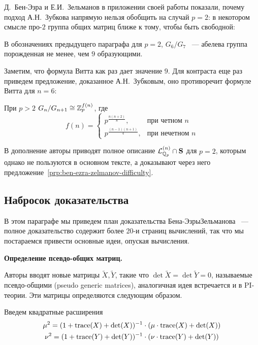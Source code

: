 Д.\ Бен-Эзра и Е.И.\ Зельманов в приложении своей работы показали, почему подход А.Н.\ Зубкова напрямую нельзя обобщить на случай $p=2$: в некотором смысле про-$2$ группа общих матриц ближе к тому, чтобы быть свободной:
\begin{proposition}
    \label{prp:ben-ezra-zelmanov-difficulty}
    В обозначениях предыдущего параграфа для $p=2$, $G_6 / G_7$ ~--- абелева группа порожденная не менее, чем $9$ образующими.
\end{proposition}
Заметим, что формула Витта как раз дает значение $9$.
Для контраста еще раз приведем предложение, доказанное А.Н.\ Зубковым, оно противоречит формуле Витта для $n=6$:
\begin{proposition}
    При $p>2$ $G_n / G_{n+1} \cong \mathbb{Z}_p^{f(n)}$, где\\
    \[
        f(n) =
        \begin{cases}
            p^{\frac{n(n+2)}{8}}, & \text{при четном $n$} \\
            p^{\frac{(n-1)(n+1)}{4}}, & \text{при нечетном $n$}
        \end{cases}
    \]
\end{proposition}

В дополнение авторы приводят полное описание $\mathcal{L}^{(n)}_{\mathbb{Q}_p} \cap \mathbf{S}$ для $p=2$, которым однако не пользуются в основном тексте, а доказывают через него предложение~\ref{prp:ben-ezra-zelmanov-difficulty}.

\subsection{Набросок доказательства}\label{subsec:ben-ezra-zelmanov-non-injective}
В этом параграфе мы приведем план доказательства Бена-Эзры\textemdash Зельманова ~--- полное доказательство содержит более 20-и страниц вычислений, так что мы постараемся привести основные идеи, опуская вычисления.

\vskip 0.1in\noindent
{\large\textbf{Определение псевдо-общих матриц.}}

Авторы вводят новые матрицы $\tilde{X}, \tilde{Y}$, такие что $\det \tilde{X} = \det \tilde{Y} = 0$, называемые псевдо-общими (pseudo generic matrices), аналогичная идея встречается и в PI-теории.
Эти матрицы определяются следующим образом.

Введем квадратные расширения
\begin{gather*}
    \mu^2 = (1 + \mathrm{trace}(X) + \det(X))^{-1} \cdot (\mu \cdot \mathrm{trace}(X) + \det(X))\\
    \nu^2 = (1 + \mathrm{trace}(Y) + \det(Y))^{-1} \cdot (\nu \cdot \mathrm{trace}(Y) + \det(Y))
\end{gather*}


